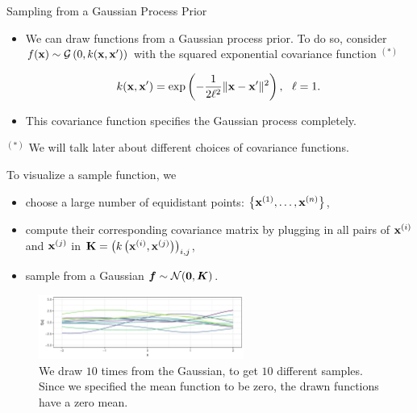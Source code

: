 \begin{frame}[c,allowframebreaks]{Sampling from a Gaussian Process Prior}

\begin{itemize}

\item We can draw functions from a Gaussian process prior. To do so, consider $f(\mathbf{x}) \sim \mathcal{G}\left(0, k(\mathbf{x}, \mathbf{x}^\prime)\right)$ with the squared exponential covariance function $^{(*)}$

$$
k(\mathbf{x}, \mathbf{x}^\prime) = \exp\left(-\frac{1}{2\ell^2}\|\mathbf{x} - \mathbf{x}^\prime\|^2\right), ~~ \ell = 1.
$$

\lz

\item This covariance function specifies the Gaussian process completely. 

\end{itemize}

\vspace{2cm}
\begin{footnotesize}
$^{(*)}$ We will talk later about different choices of covariance functions. 
\end{footnotesize}


\framebreak

To visualize a sample function, we 
\begin{itemize}
  \item choose a large number of equidistant points: $\left\{\mathbf{x}^{(1)},\dots,\mathbf{x}^{(n)}\right\}$,
  \item compute their corresponding covariance matrix by plugging in all pairs of $\mathbf{x}^{(i)}$ and $\mathbf{x}^{(j)}$ in $\textbf{K} = \left(k\left(\mathbf{x}^{(i)}, \mathbf{x}^{(j)}\right)\right)_{i,j}$,
  \item sample from a Gaussian $\bm{f} \sim \mathcal{N} (\bm{0}, \bm{K})$.
\end{itemize}

\begin{figure}
\includegraphics[width=0.6\textwidth]{figure_man/gp-sqexp-1-1.pdf}
\begin{footnotesize}
\caption*{We draw $10$ times from the Gaussian, to get $10$ different samples. Since we specified the mean function to be zero, the drawn functions have a zero mean.}
\end{footnotesize}
\end{figure}

\end{frame}

